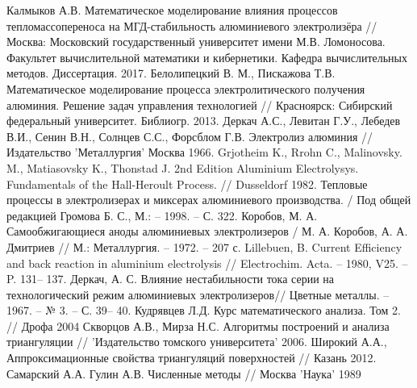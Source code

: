 \documentclass{article}
\begin{document}
\newpage
 
 
\begin{thebibliography}{}
	 Калмыков А.В. Математическое моделирование влияния процессов тепломассопереноса на МГД-стабильность алюминиевого электролизёра // Москва: Московский государственный университет имени М.В. Ломоносова. Факультет вычислительной математики и кибернетики. Кафедра вычислительных методов. Диссертация. 2017.
	  Белолипецкий В. М., Пискажова Т.В. Математическое моделирование процесса электролитического получения алюминия. Решение задач управления технологией // Красноярск: Сибирский федеральный университет. Библиогр. 2013.
	 Деркач А.С., Левитан Г.У., Лебедев В.И., Сенин В.Н., Солнцев С.С., Форсблом Г.В. Электролиз алюминия // Издательство 'Металлургия' Москва 1966.
	 Grjotheim K., Rrohn C., Malinovsky. M., Matiasovsky K., Thonstad J. 2nd Edition Aluminium Electrolysys. Fundamentals of the Hall-Heroult Process. // Dusseldorf 1982.
	 Тепловые процессы в электролизерах и миксерах алюминиевого производства. / Под общей редакцией Громова Б. С., М.: – 1998. – С. 322.
	 Коробов, М. А. Самообжигающиеся аноды алюминиевых электролизеров / М. А. Коробов, А. А. Дмитриев // М.: Металлургия. – 1972. – 207 с.
	Lillebuen, B. Current Efficiency and back reaction in aluminium electrolysis // Electrochim. Acta. – 1980, V25. – P. 131– 137. 
	Деркач, А. С. Влияние нестабильности тока серии на технологический режим алюминиевых электролизеров// Цветные металлы. – 1967. – № 3. – С. 39– 40.
	Кудрявцев Л.Д. Курс математического анализа. Том 2. // Дрофа 2004
	  Скворцов А.В., Мирза Н.С. Алгоритмы построений и анализа триангуляции // 'Издательство томского университета' 2006.
	 Широкий А.А., Аппроксимационные свойства триангуляций поверхностей // Казань 2012.
	 Самарский А.А. Гулин А.В. Численные методы // Москва 'Наука' 1989
\end{thebibliography}
\end{document}
